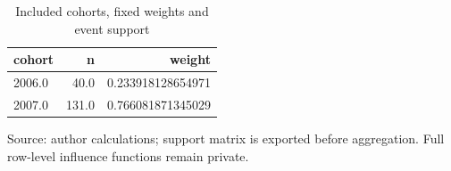 \begin{table}[htbp]
\centering
\footnotesize
\caption{Included cohorts, fixed weights and event support}
\begin{tabularx}{\linewidth}{Xrr}
\toprule
cohort & n & weight \\
\midrule
2006.0 & 40.0 & 0.233918128654971 \\
2007.0 & 131.0 & 0.766081871345029 \\
\bottomrule
\end{tabularx}
\par\vspace{3pt}\begin{minipage}{\linewidth}\footnotesize Source: author calculations; support matrix is exported before aggregation.\allowbreak{} Full row-level influence functions remain private.\allowbreak{}\end{minipage}
\end{table}
